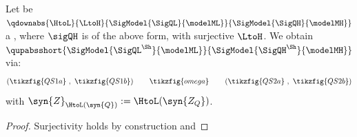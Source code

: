 \documentclass{article}
\begin{document}
\begin{proposition} \label{prop:Exact-trans-from-ref}
Let be
$\qdownabs{\HtoL}{\LtoH}{\SigModel{\SigQL}{\modelML}}{\SigModel{\SigQH}{\modelMH}}$ a \qdown{}, where $\sigQH$ 
is of the above form, with surjective $\LtoH$. We obtain \ \qup{} $\qupabsshort{\SigModel{\SigQL^\Sh}{\modelML}}{\SigModel{\SigQH^\Sh}{\modelMH}}$ via: 
\[
\left(\tikzfig{QS1a} \ , \ \tikzfig{QS1b} \right)
\qquad
\tikzfig{omega}
\qquad
\left(\tikzfig{QS2a} \ , \ \tikzfig{QS2b} \right)
\]
with $\syn{Z}_{\HtoL(\syn{Q})} := \HtoL(\syn{Z_Q})$.
\end{proposition}

\begin{proof}
Surjectivity holds by construction and 
\end{proof} 






\end{document}
